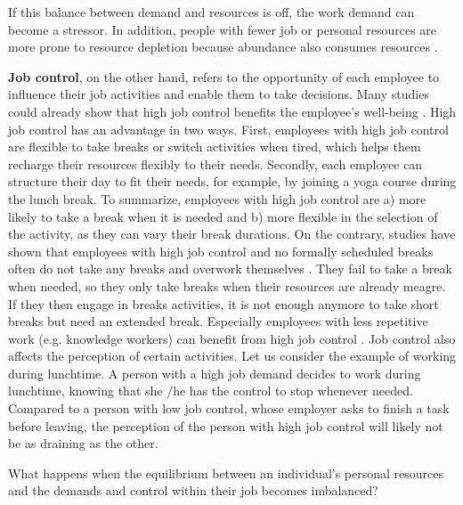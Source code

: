 \documentclass{hasel_thesis}
\begin{document}
If this balance between demand and resources is off, the work demand can become a stressor. In addition, people with fewer job or personal resources are more prone to resource depletion because abundance also consumes resources \cite{Trougakos.2009}. 

\textbf{Job control}, on the other hand, refers to the opportunity of each employee to influence their job activities \cite{Trougakos.2009} and enable them to take decisions. Many studies could already show that high job control benefits the employee's well-being \cite{Daniels.1994, Jackson.1983}. High job control has an advantage in two ways. First, employees with high job control are flexible to take breaks or switch activities when tired, which helps them recharge their resources flexibly to their needs. Secondly, each employee can structure their day to fit their needs, for example, by joining a yoga course during the lunch break. To summarize, employees with high job control are a) more likely to take a break when it is needed and b) more flexible in the selection of the activity, as they can vary their break durations.
On the contrary, studies have shown that employees with high job control and no formally scheduled breaks often do not take any breaks and overwork themselves \cite{McLean.2001}. They fail to take a break when needed, so they only take breaks when their resources are already meagre. If they then engage in breaks activities, it is not enough anymore to take short breaks but need an extended break. Especially employees with less repetitive work (e.g. knowledge workers) can benefit from high job control \cite{Trougakos.2009}. Job control also affects the perception of certain activities. Let us consider the example of working during lunchtime. A person with a high job demand decides to work during lunchtime, knowing that she /he has the control to stop whenever needed. Compared to a person with low job control, whose employer asks to finish a task before leaving, the perception of the person with high job control will likely not be as draining as the other.

What happens when the equilibrium between an individual's personal resources and the demands and control within their job becomes imbalanced?
\end{document}
